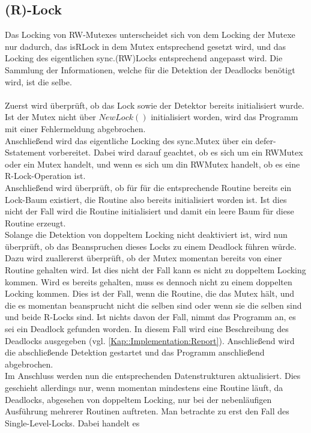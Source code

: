 \subsection{(R)-Lock}
Das Locking von RW-Mutexes unterscheidet sich von dem Locking der Mutexe nur
dadurch, das isRLock in dem Mutex entsprechend gesetzt wird, und das 
Locking des eigentlichen sync.(RW)Locks entsprechend angepasst wird. Die 
Sammlung der Informationen, welche für die Detektion der Deadlocks benötigt
wird, ist die selbe.\\\\
Zuerst wird überprüft, ob das Lock sowie der Detektor bereits initialisiert 
wurde. Ist der Mutex nicht über $NewLock()$ initialisiert worden, wird das 
Programm mit einer Fehlermeldung abgebrochen. \\
Anschließend wird das eigentliche Locking des sync.Mutex über ein defer-Sstatement
vorbereitet. Dabei wird darauf geachtet, ob es sich um ein RWMutex
oder ein Mutex handelt, und wenn es sich um din RWMutex handelt, ob es eine 
R-Lock-Operation ist.\\
Anschließend wird überprüft, ob für für die entsprechende Routine bereits ein 
Lock-Baum existiert, die Routine also bereits initialisiert worden ist. 
Ist dies nicht der Fall wird die Routine initialisiert und damit ein leere Baum 
für diese Routine erzeugt.\\
Solange die Detektion von doppeltem Locking nicht deaktiviert ist, wird nun
überprüft, ob das Beanspruchen dieses Locks zu einem Deadlock führen würde.
Dazu wird zuallererst überprüft, ob der Mutex momentan bereits von einer 
Routine gehalten wird. Ist dies nicht der Fall kann es nicht zu doppeltem Locking 
kommen. Wird es bereits gehalten, muss es dennoch nicht zu einem doppelten 
Locking kommen. Dies ist der Fall, wenn die Routine, die das Mutex hält, und 
die es momentan beansprucht nicht die selben sind oder wenn sie die selben 
sind und beide R-Locks sind. Ist nichts davon der Fall, nimmt das Programm an, 
es sei ein Deadlock gefunden worden. In diesem Fall wird eine Beschreibung des 
Deadlocks ausgegeben (vgl. \ref{Kap::Implementation:Report}). Anschließend wird 
die abschließende Detektion gestartet und das Programm anschließend abgebrochen.\\
Im Anschluss werden nun die entsprechenden Datenstrukturen aktualisiert. Dies geschieht 
allerdings nur, wenn momentan mindestens eine Routine läuft, da Deadlocks, abgesehen
von doppeltem Locking, nur bei der nebenläufigen Ausführung mehrerer Routinen 
auftreten. Man betrachte zu erst den Fall des Single-Level-Locks. Dabei handelt es 
